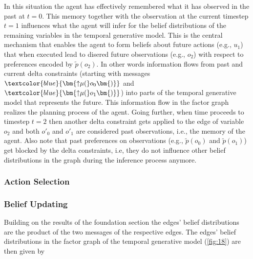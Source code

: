 \vspace{1em}
In this situation the agent has effectively remembered what it has observed in the past at \(t=0\). This memory together with the observation at the current timestep \(t=1\) influences what the agent will infer for the belief distributions of the remaining variables in the temporal generative model. This is the central mechanism that enables the agent to form beliefs about future actions (e.g., \(u_1\)) that when executed lead to disered future observations (e.g., \(o_2\)) with respect to preferences encoded by \(\tilde{p}(o_2)\). In other words information flows from past and current delta constraints (starting with messages \(\textcolor{blue}{\bm{{\uparrow}{\mu}(}o_0\bm{)}}\) and \(\textcolor{blue}{\bm{{\uparrow}{\mu}(}o_1\bm{)}}\)) into parts of the temporal generative model that represents the future. This information flow in the factor graph realizes the planning process of the agent.
Going further, when time proceeds to timestep \(t=2\) then another delta constraint gets applied to the edge of variable \(o_2\) and both \(o'_0\) and \(o'_1\) are considered past observations, i.e., the memory of the agent. Also note that past preferences on observations (e.g., \(\tilde{p}(o_0)\) and \(\tilde{p}(o_1)\)) get blocked by the delta constraints, i.e, they do not influence other belief distributions in the graph during the inference process anymore.

\subsubsection{Action Selection}



\subsubsection{Belief Updating}

Building on the results of the foundation section the edges' belief distributions are the product of the two messages of the respective edges. The edges' belief distributions in the factor graph of the temporal generative model (\cref{fig:18}) are then given by

